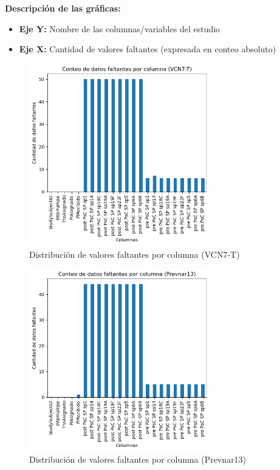 \textbf{Descripción de las gráficas:}
\begin{itemize}
    \item \textbf{Eje Y:} Nombre de las columnas/variables del estudio
    \item \textbf{Eje X:} Cantidad de valores faltantes (expresada en conteo absoluto)
\end{itemize}

\begin{figure}[H]
    \centering
    \includegraphics[width=0.7\textwidth]{Graphics/mdq.png}
    \caption{Distribución de valores faltantes por columna (VCN7-T)}
    \label{fig:mdq}
\end{figure}

\begin{figure}[H]
    \centering
    \includegraphics[width=0.7\textwidth]{Graphics/mdp.png}
    \caption{Distribución de valores faltantes por columna (Prevnar13)}
    \label{fig:mdp}
\end{figure}

